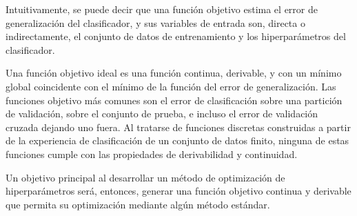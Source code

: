Intuitivamente, se puede decir que una función objetivo estima el
error de generalización del clasificador, y sus variables de entrada
son, directa o indirectamente, el conjunto de datos de entrenamiento y
los hiperparámetros del clasificador.

Una función objetivo ideal es una función continua, derivable, y con
un mínimo global coincidente con el mínimo de la función del error de
generalización.  Las funciones objetivo más comunes son el error de
clasificación sobre una partición de validación, sobre el conjunto de
prueba, e incluso el error de validación cruzada dejando uno fuera.
Al tratarse de funciones discretas construidas a partir de la
experiencia de clasificación de un conjunto de datos finito, ninguna
de estas funciones cumple con las propiedades de derivabilidad y
continuidad.

Un objetivo principal al desarrollar un método de optimización de
hiperparámetros será, entonces, generar una función objetivo continua
y derivable que permita su optimización mediante algún método
estándar.